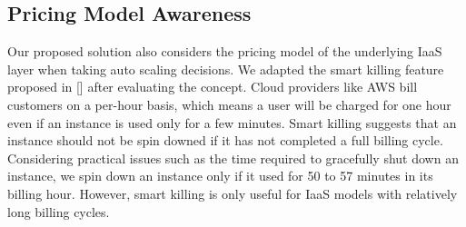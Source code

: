 \subsection {Pricing Model Awareness}

Our proposed solution also considers the pricing model of the underlying IaaS layer when taking auto scaling decisions. We adapted the smart killing feature proposed in [\cite{pluggable}] after evaluating the concept. Cloud providers like AWS bill customers on a per-hour basis, which means a user will be charged for one hour even if an instance is used only for a few minutes. Smart killing suggests that an instance should not be spin downed if it has not completed a full billing cycle. Considering practical issues such as the time required to gracefully shut down an instance, we spin down an instance only if it used for 50 to 57 minutes in its billing hour. However, smart killing is only useful for IaaS models with relatively long billing cycles.